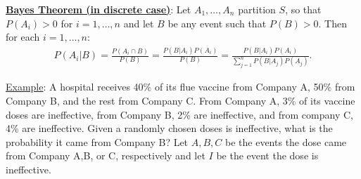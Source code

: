 \documentclass[11pt]{article}
\begin{document}
\vspace{0.1in}
\noindent \underline{{\bf Bayes Theorem (in discrete case)}}:  Let $A_{1}, \ldots,
A_{n}$ partition $S$, so that $P(A_{i})>0$ for $i=1, \ldots, n$ and let $B$
be any event such that $P(B)>0$.  Then for each $i=1, \ldots, n$:
\begin{eqnarray*}
P(A_{i}|B) = \frac{P(A_i\cap B)}{P(B)}= \frac{P(B|A_{i})P(A_{i})}{P(B)}  = \frac{P(B|A_{i})P(A_{i})}{\sum_{j=1}
^{n} P(B|A_{j})P(A_{j})}.
\end{eqnarray*}

\noindent \underline{Example}: A hospital receives 40\% of its flue vaccine from Company A, 50\% from Company B, and the rest from Company C. From Company A, 3\% of its vaccine doses are ineffective, from Company B, 2\% are ineffective, and from company C, 4\% are ineffective.  Given a randomly chosen doses is ineffective, what is the probability it came from Company B? Let $A,B,C$ be the events the dose came from Company A,B, or C, respectively and let $I$ be the event the dose is ineffective. 

\vfill
\end{document}
